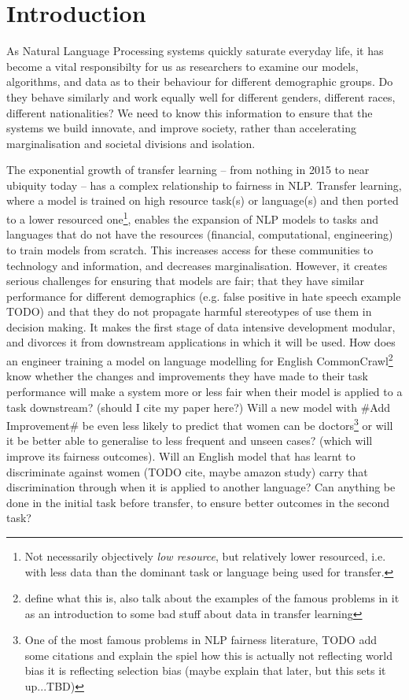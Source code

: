\chapter{Introduction} \label{chapter:introduction}
As Natural Language Processing systems quickly saturate everyday life, it has become a vital responsibilty for us as researchers to examine our models, algorithms, and data as to their behaviour for different demographic groups. Do they behave similarly and work equally well for different genders, different races, different nationalities? We need to know this information to ensure that the systems we build innovate, and improve society, rather than accelerating marginalisation and societal divisions and isolation. 

The exponential growth of transfer learning -- from nothing in 2015 to near ubiquity today -- has a complex relationship to fairness in NLP. Transfer learning, where a model is trained on high resource task(s) or language(s) and then ported to a lower resourced one\footnote{Not necessarily objectively \textit{low resource}, but relatively lower resourced, i.e. with less data than the dominant task or language being used for transfer.}, enables the expansion of NLP models to tasks and languages that do not have the resources (financial, computational, engineering) to train models from scratch. This increases access for these communities %
to technology and information, and decreases marginalisation. However, it creates serious challenges for ensuring that models are fair; that they have similar performance for different demographics (e.g. false positive in hate speech example TODO) and that they do not propagate harmful stereotypes of use them in decision making. It makes the first stage of data intensive development modular, and divorces it from downstream applications in which it will be used. How does an engineer training a model on language modelling for English CommonCrawl\footnote{define what this is, also talk about the examples of the famous problems in it as an introduction to some bad stuff about data in transfer learning} know whether the changes and improvements they have made to their task performance will make a system more or less fair when their model is applied to a task downstream? (should I cite my paper here?)  Will a new model with #Add Improvement# be even less likely to predict that women can be doctors\footnote{One of the most famous problems in NLP fairness literature, TODO add some citations and explain the spiel how this is actually not reflecting world bias it is reflecting selection bias (maybe explain that later, but this sets it up...TBD)} or will it be better able to generalise to less frequent and unseen cases? (which will improve its fairness outcomes). Will an English model that has learnt to discriminate against women (TODO cite, maybe amazon study) carry that discrimination through when it is applied to another language? Can anything be done in the initial task before transfer, to ensure better outcomes in the second task?
